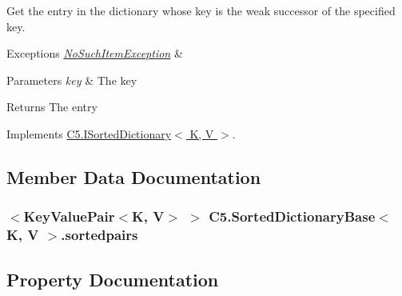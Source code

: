 Get the entry in the dictionary whose key is the weak successor of the specified key. 


\begin{DoxyExceptions}{Exceptions}
{\em \hyperlink{class_c5_1_1_no_such_item_exception}{No\+Such\+Item\+Exception}} & \\
\hline
\end{DoxyExceptions}

\begin{DoxyParams}{Parameters}
{\em key} & The key\\
\hline
\end{DoxyParams}
\begin{DoxyReturn}{Returns}
The entry
\end{DoxyReturn}


Implements \hyperlink{interface_c5_1_1_i_sorted_dictionary_a3829a2cfb58bc90c600eb2fcc12e1d25}{C5.\+I\+Sorted\+Dictionary$<$ K, V $>$}.



\subsection{Member Data Documentation}
\hypertarget{class_c5_1_1_sorted_dictionary_base_ac8cd7ef2783fe7109e21d0f7456b2d47}{}
\subsubsection[{sortedpairs}]{$<${\bf Key\+Value\+Pair}$<$K, V$>$ $>$ {\bf C5.\+Sorted\+Dictionary\+Base}$<$ K, V $>$.sortedpairs\hspace{0.3cm}{\ttfamily [protected]}}\label{class_c5_1_1_sorted_dictionary_base_ac8cd7ef2783fe7109e21d0f7456b2d47}






\subsection{Property Documentation}
\hypertarget{class_c5_1_1_sorted_dictionary_base_a0fedf269f1b51cf8b0ed3a46227936ac}{}

